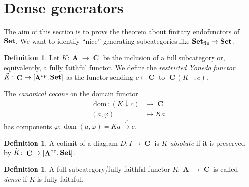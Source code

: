 \documentclass[a4paper,11pt,fullpage,oneside,openany]{amsbook}
\newcommand{\catname}[1]{{\normalfont\textbf{#1}}}
\newcommand{\Set}{\catname{Set}}
\DeclareMathOperator{\op}{\text{op}}
\DeclareMathOperator{\A}{\mathbf{A}}
\DeclareMathOperator{\C}{\mathbf{C}}
\DeclareMathOperator{\dom}{dom}
\theoremstyle{definition}
\theoremstyle{definition}
\newtheorem{defn}[thm]{Definition} %
\theoremstyle{remark}
\begin{document}
\section{Dense generators}
The aim of this section is to prove the theorem about finitary endofunctors of $\Set$. We want to identify ``nice'' generating subcategories like $\Set_\text{fin}\to\Set$.
\begin{defn}
	Let $K\colon\A\to\C$ be the inclusion of a full subcategory or, equivalently, a fully faithful functor. We define the \emph{restricted Yoneda functor} $\widetilde{K}\colon\C\to\left[\A^{\op},\Set\right]$ as the functor sending $c\in\C$ to $\C(K-,c)$.
\end{defn}
The \emph{canonical cocone} on the domain functor
\begin{align*}
\dom\colon(K\downarrow c)&\to\C\\
(a,\varphi)&\mapsto Ka
\end{align*}
has components $\varphi\colon\dom(a,\varphi)=Ka\xrightarrow{\varphi}c$.
\begin{defn}
	A colimit of a diagram $D\colon I\to\C$ is \emph{$K$-absolute} if it is preserved by $\widetilde{K}\colon\C\to\left[\A^{\op},\Set\right]$.
\end{defn}
	\begin{defn}
		A full subcategory/fully faithful functor $K\colon\A\to\C$ is called \emph{dense} if $\widetilde{K}$ is fully faithful.
	\end{defn}
\end{document}
